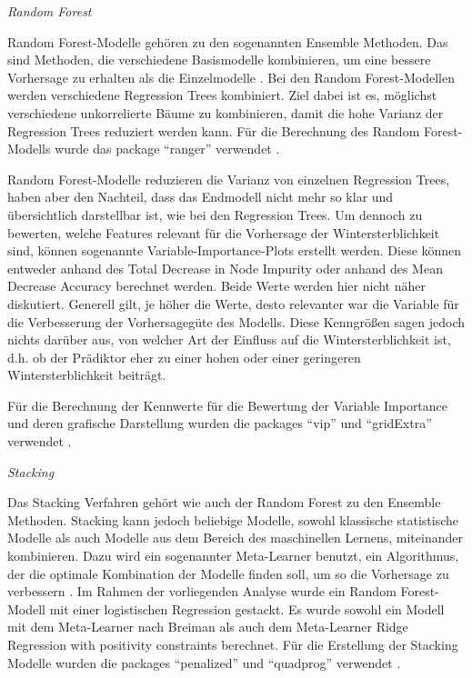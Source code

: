 \textit{Random Forest}

Random Forest-Modelle gehören zu den sogenannten Ensemble Methoden. Das sind Methoden, die verschiedene Basismodelle kombinieren, um eine bessere Vorhersage zu erhalten als die Einzelmodelle \citep{smolyakov2017}. Bei den Random Forest-Modellen werden verschiedene Regression Trees kombiniert. Ziel dabei ist es, möglichst verschiedene unkorrelierte Bäume zu kombinieren, damit die hohe Varianz der Regression Trees reduziert werden kann. Für die Berechnung des Random Forest-Modells wurde das package \enquote{ranger} verwendet \citep{ranger}.

Random Forest-Modelle reduzieren die Varianz von einzelnen Regression Trees, haben aber den Nachteil, dass das Endmodell nicht mehr so klar und übersichtlich darstellbar ist, wie bei den Regression Trees. Um dennoch zu bewerten, welche Features relevant für die Vorhersage der Wintersterblichkeit sind, können sogenannte Variable-Importance-Plots erstellt werden. Diese können entweder anhand des Total Decrease in Node Impurity oder anhand des Mean Decrease Accuracy berechnet werden. Beide Werte werden hier nicht näher diskutiert. Generell gilt, je höher die Werte, desto relevanter war die Variable für die Verbesserung der Vorhersagegüte des Modells. Diese Kenngrößen sagen jedoch nichts darüber aus, von welcher Art der Einfluss auf die Wintersterblichkeit ist, d.h. ob der Prädiktor eher zu einer hohen oder einer geringeren Wintersterblichkeit beiträgt. 

Für die Berechnung der Kennwerte für die Bewertung der Variable Importance und deren grafische Darstellung wurden die packages \enquote{vip} und \enquote{gridExtra} verwendet \citep{vip, gridExtra}.


\textit{Stacking}

Das Stacking Verfahren gehört wie auch der Random Forest zu den Ensemble Methoden. Stacking kann jedoch beliebige Modelle, sowohl klassische statistische Modelle als auch Modelle aus dem Bereich des maschinellen Lernens, miteinander kombinieren. Dazu wird ein sogenannter Meta-Learner benutzt, ein Algorithmus, der die optimale Kombination der Modelle finden soll, um so die Vorhersage zu verbessern \citep{breiman1996}. Im Rahmen der vorliegenden Analyse wurde ein Random Forest-Modell mit einer logistischen Regression gestackt. Es wurde sowohl ein Modell mit dem Meta-Learner nach Breiman als auch dem Meta-Learner Ridge Regression with positivity constraints berechnet. 
Für die Erstellung der Stacking Modelle wurden die packages \enquote{penalized} und \enquote{quadprog} verwendet \citep{penalized, quadprog}.


